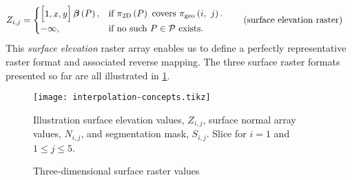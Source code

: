 \begin{align*}
  Z_{i,j} &= \begin{cases}
    \begin{bmatrix}1, x, y\end{bmatrix} \boldsymbol{\beta}\left(P\right), &\text{if } \pi_{\mathrm{2D}}\left(P\right) \text{ covers } \pi_{\mathrm{geo}}\left(i,~j\right).\\
    -\infty, &\text{if no such } P \in \mathcal{P} \text{ exists}.
  \end{cases}
  \tag{surface elevation raster}
\end{align*}
This \textit{surface elevation} raster array enables us to define a perfectly representative raster format and associated reverse mapping.
The three surface raster formats presented so far are all illustrated in \cref{fig:interpolation-concepts}.
\begin{figure}
  \centering
  \texttt{[image: interpolation-concepts.tikz]}
  \caption{Three-dimensional surface raster values}{%
    Illustration surface elevation values, $Z_{i,j}$, surface normal array values, $N_{i,j}$, and segmentation mask, $S_{i,j}$.
    Slice for $i = 1$ and $1 \leq j \leq 5$.
  }%
  \label{fig:interpolation-concepts}
\end{figure}

